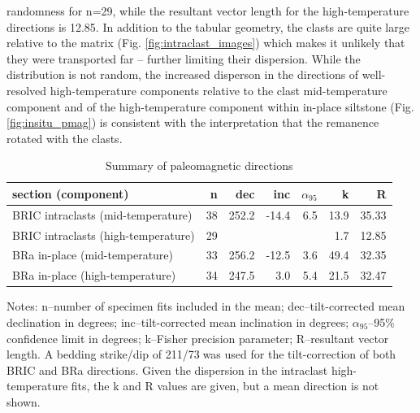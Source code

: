 \documentclass[draft]{agujournal2019}
\begin{document}
randomness for n=29, while the resultant vector length for the high-temperature directions is 12.85. In addition to the tabular geometry, the clasts are quite large relative to the matrix (Fig. \ref{fig:intraclast_images}) which makes it unlikely that they were transported far -- further limiting their dispersion. While the distribution is not random, the increased disperson in the directions of well-resolved high-temperature components relative to the clast mid-temperature component and of the high-temperature component within in-place siltstone (Fig. \ref{fig:insitu_pmag}) is consistent with the interpretation that the remanence rotated with the clasts.

\begin{table}[h!]
\footnotesize
\caption{Summary of paleomagnetic directions}
\begin{tabular}{|l|r|r|r|r|r|r|}
\hline
section (component) & n & dec & inc & $\alpha_{95}$ & k & R \\
\hline
BRIC intraclasts (mid-temperature) & 38 & 252.2 &  -14.4 & 6.5 & 13.9 &  35.33  \\
BRIC intraclasts (high-temperature) & 29 &  &   &  & 1.7 &  12.85  \\
BRa in-place (mid-temperature) & 33 & 256.2 &  -12.5 & 3.6 & 49.4 &  32.35  \\
BRa in-place (high-temperature) & 34 & 247.5 &  3.0 & 5.4 & 21.5 &  32.47  \\
\hline
\end{tabular}
\begin{tablenotes}
Notes: n--number of specimen fits included in the mean; dec--tilt-corrected mean declination in degrees; inc--tilt-corrected mean inclination in degrees; $\alpha_{95}$--95$\%$ confidence limit in degrees; k--Fisher precision parameter; R--resultant vector length. A bedding strike/dip of 211\textdegree/73\textdegree$\;$was used for the tilt-correction of both BRIC and BRa directions. Given the dispersion in the intraclast high-temperature fits, the k and R values are given, but a mean direction is not shown.
\end{tablenotes}

\label{tab:pmag_sites}
\end{table}
\end{document}
